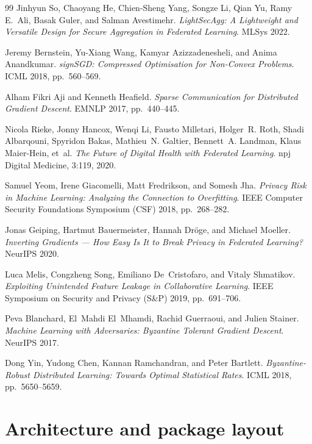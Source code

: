 \documentclass[11pt,a4paper]{report}
\begin{document}
\begin{thebibliography}{99}
Jinhyun So, Chaoyang He, Chien-Sheng Yang, Songze Li, Qian Yu,
Ramy E.\ Ali, Basak Guler, and Salman Avestimehr.
\emph{LightSecAgg: A Lightweight and Versatile Design for Secure
Aggregation in Federated Learning}.
MLSys 2022.

Jeremy Bernstein, Yu-Xiang Wang, Kamyar Azizzadenesheli, and
Anima Anandkumar.
\emph{signSGD: Compressed Optimisation for Non-Convex Problems}.
ICML 2018, pp.\ 560--569.

Alham Fikri Aji and Kenneth Heafield.
\emph{Sparse Communication for Distributed Gradient Descent}.
EMNLP 2017, pp.\ 440--445.

Nicola Rieke, Jonny Hancox, Wenqi Li, Fausto Milletari, Holger~R. Roth,
Shadi Albarqouni, Spyridon Bakas, Mathieu~N. Galtier, Bennett~A. Landman,
Klaus Maier-Hein, et~al.
\emph{The Future of Digital Health with Federated Learning}.
npj Digital Medicine, 3:119, 2020.

Samuel Yeom, Irene Giacomelli, Matt Fredrikson, and Somesh Jha.
\emph{Privacy Risk in Machine Learning: Analyzing the Connection to
Overfitting}.
IEEE Computer Security Foundations Symposium (CSF) 2018, pp.\ 268--282.

Jonas Geiping, Hartmut Bauermeister, Hannah Dr{\"o}ge, and
Michael Moeller.
\emph{Inverting Gradients --- How Easy Is It to Break Privacy in
Federated Learning?}
NeurIPS 2020.

Luca Melis, Congzheng Song, Emiliano De~Cristofaro, and Vitaly Shmatikov.
\emph{Exploiting Unintended Feature Leakage in Collaborative Learning}.
IEEE Symposium on Security and Privacy (S\&P) 2019, pp.\ 691--706.

Peva Blanchard, El~Mahdi El~Mhamdi, Rachid Guerraoui, and Julien Stainer.
\emph{Machine Learning with Adversaries: Byzantine Tolerant Gradient
Descent}.
NeurIPS 2017.

Dong Yin, Yudong Chen, Kannan Ramchandran, and Peter Bartlett.
\emph{Byzantine-Robust Distributed Learning: Towards Optimal Statistical
Rates}.
ICML 2018, pp.\ 5650--5659.

\end{thebibliography}

\appendix

\chapter{Architecture and package layout}\label{app:arch}
\end{document}
